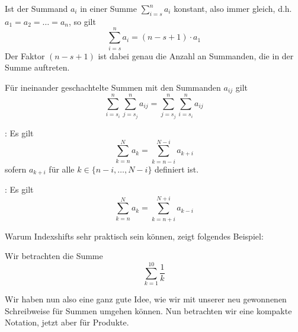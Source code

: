 \begin{proposition}\label{prop:rechnen-mit-summen}
    \begin{thmenum}
        \item {} Ist der Summand \(a_i\) in einer Summe \(\sum_{i=s}^n a_i\) konstant, also immer gleich, d.h. \(a_1 = a_2 = \dots = a_n\), so gilt \begin{equation*}
            \sum_{i=s}^n a_i = (n-s+1)\cdot a_1
        \end{equation*}
        Der Faktor \((n-s+1)\) ist dabei genau die Anzahl an Summanden, die in der Summe auftreten. 

        \item \label{prop:rechnen-mit-summen-(2)}  Für ineinander geschachtelte Summen mit den Summanden \(a_{ij}\) gilt 
        \begin{equation*}
            \sum_{i=s_i}^n \sum_{j=s_j}^n a_{ij} = \sum_{j=s_j}^n \sum_{i=s_i}^n a_{ij}
        \end{equation*}

        \item {}: Es gilt 
        \begin{equation*}
            \sum_{k=n}^N a_k = \sum_{k=n-i}^{N-i} a_{k+i}
        \end{equation*}
        sofern \(a_{k+i}\) für alle \(k\in \{n-i, \dots, N-i\}\) definiert ist. 

        \item {}: Es gilt 
        \begin{equation*}
            \sum_{k=n}^N a_k = \sum_{k=n+i}^{N+i} a_{k-i}
        \end{equation*}
        
    \end{thmenum}
\end{proposition}
Warum Indexshifts sehr praktisch sein können, zeigt folgendes Beispiel:  

\begin{exampleth}
    Wir betrachten die Summe 
    \begin{equation*}
        \sum_{k=1}^{10} \frac{1}{k}
    \end{equation*}
    
\end{exampleth}

Wir haben nun also eine ganz gute Idee, wie wir mit unserer neu gewonnenen Schreibweise für Summen umgehen können. Nun betrachten wir eine kompakte Notation, jetzt aber für Produkte. 

